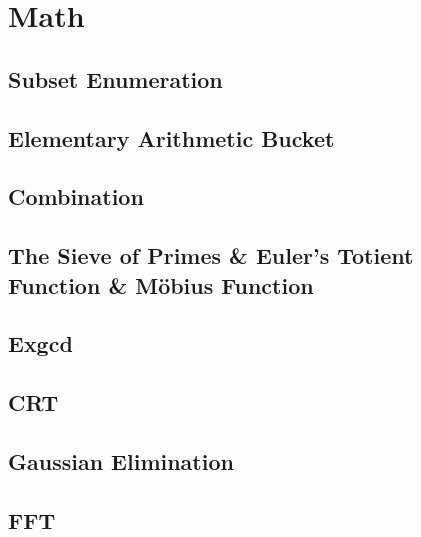 \documentclass[a4paper]{article}
\begin{document}


\pagebreak

\section{Math}

\subsection{Subset Enumeration}



\subsection{Elementary Arithmetic Bucket}



\subsection{Combination}



\subsection{The Sieve of Primes \& Euler's Totient Function \& Möbius Function}



\subsection{Exgcd}



\subsection{CRT}



\subsection{Gaussian Elimination}



\subsection{FFT}
\end{document}
